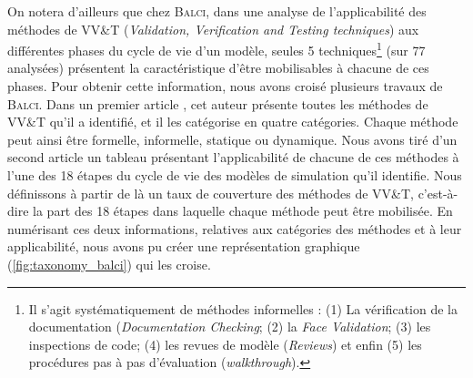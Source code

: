 On notera d'ailleurs que chez B\textsc{alci}, dans une analyse de l'applicabilité des méthodes de \og VV\&T\fg{} (\textit{Validation, Verification and Testing techniques}) aux différentes phases du cycle de vie d'un modèle, seules 5 techniques\footnote{
	Il s'agit systématiquement de méthodes \og informelles\fg{} : 
	(1) La vérification de la documentation (\textit{Documentation Checking}; (2) la \textit{Face Validation}; (3) les inspections de code; (4) les \og revues\fg{} de modèle (\textit{Reviews}) et enfin (5) les \og procédures pas à pas\fg{} d'évaluation (\textit{walkthrough}).
} (sur 77 analysées) présentent la caractéristique d'être mobilisables à chacune de ces phases.
Pour obtenir cette information, nous avons croisé plusieurs travaux de \textsc{Balci}.
Dans un premier article \autocite{balci_verification_1997}, cet auteur présente toutes les méthodes de VV\&T qu'il a identifié, et il les catégorise en quatre catégories.
Chaque méthode peut ainsi être formelle, informelle, statique ou dynamique.
Nous avons tiré d'un second article \autocite{balci1998verification} un tableau présentant l'applicabilité de chacune de ces méthodes à l'une des 18 étapes du \og cycle de vie\fg{} des modèles de simulation qu'il identifie.
Nous définissons à partir de là un \og taux de couverture\fg{} des méthodes de VV\&T, c'est-à-dire la part des 18 étapes dans laquelle chaque méthode peut être mobilisée.
En numérisant ces deux informations, relatives aux catégories des méthodes et à leur applicabilité, nous avons pu créer une représentation graphique (\cref{fig:taxonomy_balci}) qui les croise.


